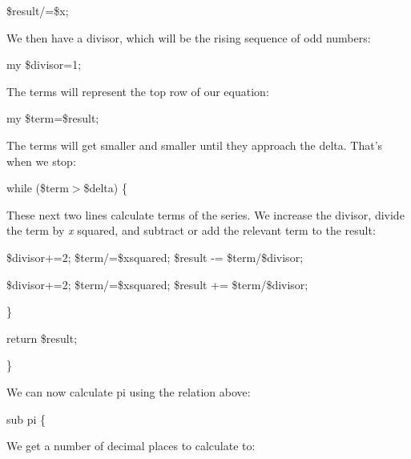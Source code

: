 \documentclass[a4paper,11pt]{book}
\begin{document}
\noindent 

\noindent 

\noindent \$result/=\$x;

\noindent 

\noindent We then have a divisor, which will be the rising sequence of odd numbers:

\noindent 

\noindent 

\noindent my \$divisor=1;

\noindent 

\noindent The terms will represent the top row of our equation:

\noindent 

\noindent 

\noindent my \$term=\$result;

\noindent 

\noindent The terms will get smaller and smaller until they approach the delta. That's when we stop:

\noindent 

\noindent 

\noindent while (\$term$>$\$delta) \{

\noindent 

\noindent These next two lines calculate terms of the series. We increase the divisor, divide the term by \textit{x }squared, and subtract or add the relevant term to the result:

\noindent 

\noindent 

\noindent \$divisor+=2; \$term/=\$xsquared; \$result -= \$term/\$divisor;

\noindent \$divisor+=2; \$term/=\$xsquared; \$result += \$term/\$divisor;

\noindent \}

\noindent return \$result;

\noindent \}

\noindent 

\noindent We can now calculate pi using the relation above:

\noindent 

\noindent 

\noindent sub pi \{

\noindent 

\noindent 

\noindent We get a number of decimal places to calculate to:

\noindent 

\noindent 
\end{document}
